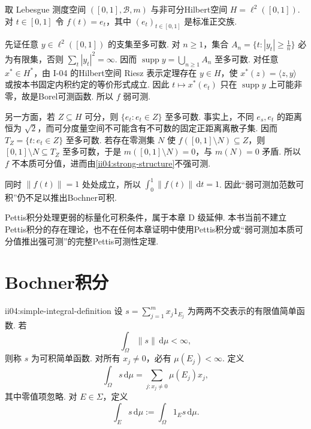 \begin{FACounterexample}[弱可测但不强可测]\label{ii04:weak-not-strong}
取 Lebesgue 测度空间 \(\displaystyle([0,1],\mathcal B,m)\) 与非可分Hilbert空间
\(\displaystyle H=\ell^2([0,1]).\)
对 \(\displaystyle t\in[0,1]\) 令 \(\displaystyle f(t)=e_t\)，其中 \(\displaystyle(e_t)_{t\in[0,1]}\) 是标准正交族.

先证任意 \(\displaystyle y\in\ell^2([0,1])\) 的支集至多可数. 对 \(\displaystyle n\geqslant1\)，集合
\(\displaystyle A_n=\{t:|y_t|\geqslant\frac{1}{n}\}\)
必为有限集，否则 \(\displaystyle\sum_t|y_t|^2=\infty\). 因而 \(\displaystyle\operatorname{supp}y=\bigcup_{n\geqslant1}A_n\) 至多可数. 对任意 \(\displaystyle x^*\in H^*\)，由 I-04 的Hilbert空间 Riesz 表示定理存在 \(\displaystyle y\in H\)，使 \(\displaystyle x^*(z)=\langle z,y\rangle\) 或按本书固定内积约定的等价形式成立. 因此 \(\displaystyle t\mapsto x^*(e_t)\) 只在 \(\displaystyle\operatorname{supp}y\) 上可能非零，故是Borel可测函数. 所以 \(\displaystyle f\) 弱可测.

另一方面，若 \(\displaystyle Z\subseteq H\) 可分，则 \(\displaystyle\{e_t:e_t\in Z\}\) 至多可数. 事实上，不同 \(\displaystyle e_s,e_t\) 的距离恒为 \(\displaystyle\sqrt2\)，而可分度量空间不可能含有不可数的固定正距离离散子集. 因而
\(\displaystyle T_Z=\{t:e_t\in Z\}\)
至多可数. 若存在零测集 \(\displaystyle N\) 使 \(\displaystyle f([0,1]\setminus N)\subseteq Z\)，则 \(\displaystyle[0,1]\setminus N\subseteq T_Z\) 至多可数，于是 \(\displaystyle m([0,1]\setminus N)=0\)，与 \(\displaystyle m(N)=0\) 矛盾. 所以 \(\displaystyle f\) 不本质可分值，进而由\autoref{ii04:strong-structure}不强可测.

同时 \(\displaystyle\|f(t)\|=1\) 处处成立，所以 \(\displaystyle\int_0^1\|f(t)\|\,\mathrm{d}t=1\). 因此“弱可测加范数可积”仍不足以推出Bochner可积.
\end{FACounterexample}

\begin{FARemark}[Pettis边界]\label{ii04:pettis-boundary}
Pettis积分处理更弱的标量化可积条件，属于本章 D 级延伸. 本书当前不建立Pettis积分的存在理论，也不在任何本章证明中使用Pettis积分或“弱可测加本质可分值推出强可测”的完整Pettis可测性定理.
\end{FARemark}

\section{Bochner积分}\label{sec:ii04-bochner-integral}

\begin{FADefinition}[A][可积简单函数及其积分]{ii04:simple-integral-definition}
设 \(\displaystyle s=\sum_{j=1}^{m}x_j1_{E_j}\) 为两两不交表示的有限值简单函数. 若
\[
\int_\Omega\|s\|\,\mathrm{d}\mu<\infty,
\]
则称 \(\displaystyle s\) 为可积简单函数. 对所有 \(\displaystyle x_j\neq0\)，必有 \(\displaystyle\mu(E_j)<\infty\). 定义
\[
\int_\Omega s\,\mathrm{d}\mu
=
\sum_{j:x_j\neq0}\mu(E_j)x_j,
\]
其中零值项忽略. 对 \(\displaystyle E\in\Sigma\)，定义
\[
\int_Es\,\mathrm{d}\mu
:=
\int_\Omega1_Es\,\mathrm{d}\mu.
\]
\end{FADefinition}

